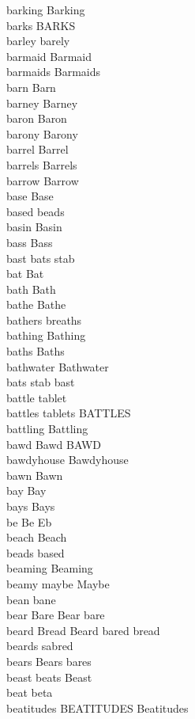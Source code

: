 barking Barking\\
barks BARKS\\
barley barely\\
barmaid Barmaid\\
barmaids Barmaids\\
barn Barn\\
barney Barney\\
baron Baron\\
barony Barony\\
barrel Barrel\\
barrels Barrels\\
barrow Barrow\\
base Base\\
based beads\\
basin Basin\\
bass Bass\\
bast bats stab\\
bat Bat\\
bath Bath\\
bathe Bathe\\
bathers breaths\\
bathing Bathing\\
baths Baths\\
bathwater Bathwater\\
bats stab bast\\
battle tablet\\
battles tablets BATTLES\\
battling Battling\\
bawd Bawd BAWD\\
bawdyhouse Bawdyhouse\\
bawn Bawn\\
bay Bay\\
bays Bays\\
be Be Eb\\
beach Beach\\
beads based\\
beaming Beaming\\
beamy maybe Maybe\\
bean bane\\
bear Bare Bear bare\\
beard Bread Beard bared bread\\
beards sabred\\
bears Bears bares\\
beast beats Beast\\
beat beta\\
beatitudes BEATITUDES Beatitudes\\
